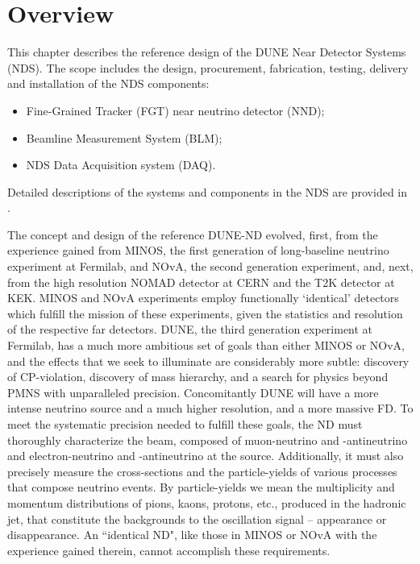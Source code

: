 \section{Overview} %
\label{sec:detectors-nd-ref-ov}

This chapter describes the reference design of the DUNE Near Detector Systems (NDS). The scope includes the design, procurement, fabrication, testing, delivery and installation of the NDS components: 

\begin{itemize}
\item Fine-Grained Tracker (FGT) near neutrino detector (NND);
\item Beamline Measurement System (BLM);  
\item NDS Data Acquisition system (DAQ).  
\end{itemize}
Detailed descriptions of the systems and components in the NDS are provided in \anxndref. 


The concept and design of the reference DUNE-ND evolved, first,  from the experience gained 
from MINOS, the first generation of long-baseline neutrino experiment at Fermilab, 
and NOvA, the second generation experiment, and, next, from the high resolution NOMAD detector at CERN 
and the T2K detector at KEK. MINOS and NOvA experiments employ functionally `identical' detectors which 
fulfill the mission of these experiments, given the statistics and resolution of the respective far detectors. 
DUNE, the third generation experiment at Fermilab, has a much more ambitious set of goals than 
either MINOS or NOvA,  and the effects that we seek to illuminate are
considerably more subtle: 
discovery of CP-violation, discovery of mass hierarchy, and a search for 
physics beyond PMNS with unparalleled precision. Concomitantly DUNE will have a more intense 
neutrino source and a much higher resolution, and a more massive FD.  
To meet the systematic precision needed to fulfill these goals,
the ND must thoroughly characterize the beam, composed of muon-neutrino and -antineutrino 
and electron-neutrino and -antineutrino at the source. Additionally, it must also precisely measure 
the cross-sections and the particle-yields of various processes that compose  neutrino events. 
By particle-yields we mean the multiplicity and momentum distributions of pions, kaons, protons, etc., 
produced in the hadronic jet, that constitute the backgrounds to the oscillation signal -- appearance or 
disappearance. An ``identical ND", like those in MINOS or NOvA with the experience gained therein, 
cannot accomplish these requirements. 

